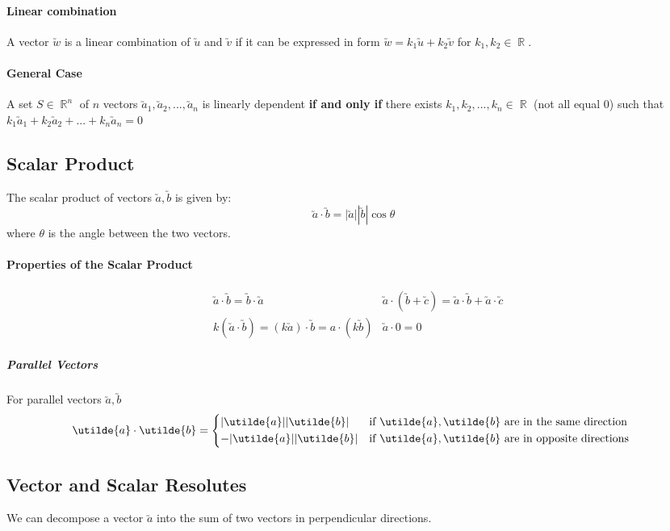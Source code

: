 \documentclass[a4paper,twoside]{article}
\DeclareMathOperator\R{\mathbb{R}}
\begin{document}
			\paragraph{Linear combination} A vector $\utilde{w}$ is a linear combination of $\utilde{u}$ and $\utilde{v}$ if it can be expressed in form $\utilde{w}=k_1\utilde{u}+k_2\utilde{v}$ for $k_1,k_2\in\R$.
			\paragraph{General Case} A set $S\in\R^n$ of $n$ vectors $\utilde{a}_1,\utilde{a}_2,...,\utilde{a}_n$ is linearly dependent \textbf{if and only if} there exists $k_1,k_2,...,k_n\in\R$ (not all equal 0) such that $k_1\utilde{a}_1+k_2\utilde{a}_2+...+k_n\utilde{a}_n=0$
		\subsection{Scalar Product}
			The scalar product of vectors $\utilde{a},\utilde{b}$ is given by:
			\[
			\utilde{a}\cdot\utilde{b}=|\utilde{a}||\utilde{b}|\cos\theta
			\]
			where $\theta$ is the angle between the two vectors.
			\paragraph{Properties of the Scalar Product}
			\begin{align*}
				&\utilde{a}\cdot\utilde{b}=\utilde{b}\cdot\utilde{a} &\utilde{a}\cdot\left(\utilde{b}+\utilde{c}\right)=\utilde{a}\cdot\utilde{b}+\utilde{a}\cdot\utilde{c} \\
				&k\left(\utilde{a}\cdot\utilde{b}\right)=\left(k\utilde{a}\right)\cdot\utilde{b}=a\cdot\left(k\utilde{b}\right) &\utilde{a}\cdot0=0
			\end{align*}
				\subparagraph{Parallel Vectors} For parallel vectors $\utilde{a},\utilde{b}$
				\[
					\utilde{a}\cdot\utilde{b}=\begin{cases*}
						|\utilde{a}||\utilde{b}| & if $\utilde{a},\utilde{b}$ are in the same direction \\
						-|\utilde{a}||\utilde{b}| & if $\utilde{a},\utilde{b}$ are in opposite directions
					\end{cases*}
				\]
		\subsection{Vector and Scalar Resolutes}
			We can decompose a vector $\utilde{a}$ into the sum of two vectors in perpendicular directions.
\end{document}
